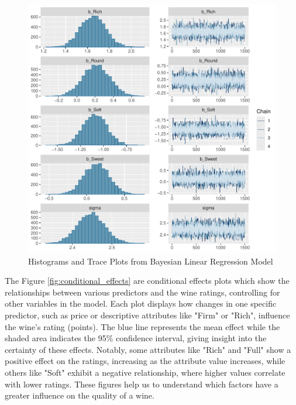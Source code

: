 \documentclass{article}
\begin{document}
\begin{figure}[htbp]
\begin{minipage}{0.45\textwidth}
	\end{minipage}
	\vspace{1cm} %
	\begin{minipage}{0.45\textwidth}
		\centering
		\includegraphics[width=\textwidth]{imgs/histograms_trace_plots_3.pdf}
	\end{minipage}
	\caption{Histograms and Trace Plots from Bayesian Linear Regression Model}
	\label{fig:combined_predictors}
\end{figure}


The Figure \ref{fig:conditional_effects} are conditional effects plots which show the relationships between various predictors and the wine ratings, controlling for other variables in the model. Each plot displays how changes in one specific predictor, such as price or descriptive attributes like "Firm" or "Rich", influence the wine's rating (points). The blue line represents the mean effect while the shaded area indicates the 95\% confidence interval, giving insight into the certainty of these effects. Notably, some attributes like "Rich" and "Full" show a positive effect on the ratings, increasing as the attribute value increases, while others like "Soft" exhibit a negative relationship, where higher values correlate with lower ratings. These figures help us to understand which factors have a greater influence on the quality of a wine.
\end{document}
